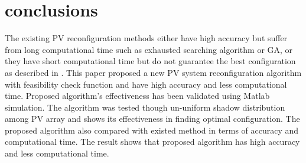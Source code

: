 \documentclass[conference]{IEEEtran}
\begin{document}
\section{conclusions}
The existing PV reconfiguration methods either have high accuracy but suffer from long computational time such as exhausted searching algorithm or GA, or they have short computational time but do not guarantee the best configuration as described in \cite{b10}. This paper proposed a new PV system reconfiguration algorithm with feasibility check function and have high accuracy and less computational time. Proposed algorithm's effectiveness has been validated using Matlab simulation. The algorithm was tested though un-uniform shadow distribution among PV array and shows its effectiveness in finding optimal configuration. The proposed algorithm also compared with existed method in terms of accuracy and computational time. The result shows that proposed algorithm has high accuracy and less computational time.
\end{document}
